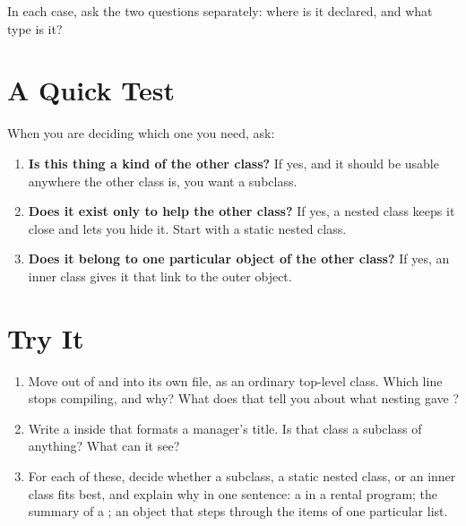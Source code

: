 \documentclass[11pt]{article}
\begin{document}
In each case, ask the two questions separately: where is it declared, and what type is it?

\section{A Quick Test}

When you are deciding which one you need, ask:

\begin{enumerate}[leftmargin=1.6em]
  \item \textbf{Is this thing a kind of the other class?} If yes, and it should be usable
        anywhere the other class is, you want a subclass.
  \item \textbf{Does it exist only to help the other class?} If yes, a nested class keeps it close
        and lets you hide it. Start with a static nested class.
  \item \textbf{Does it belong to one particular object of the other class?} If yes, an inner
        class gives it that link to the outer object.
\end{enumerate}

\section{Try It}

\begin{enumerate}[leftmargin=1.6em]
  \item Move  out of  and into its own file, as an ordinary top-level
        class. Which line stops compiling, and why? What does that tell you about what nesting
        gave ?
  \item Write a  inside  that formats a manager's title. Is
        that class a subclass of anything? What can it see?
  \item For each of these, decide whether a subclass, a static nested class, or an inner class
        fits best, and explain why in one sentence: a  in a rental program; the
         summary of a ; an object that steps through the items of one
        particular list.
\end{enumerate}
\end{document}
